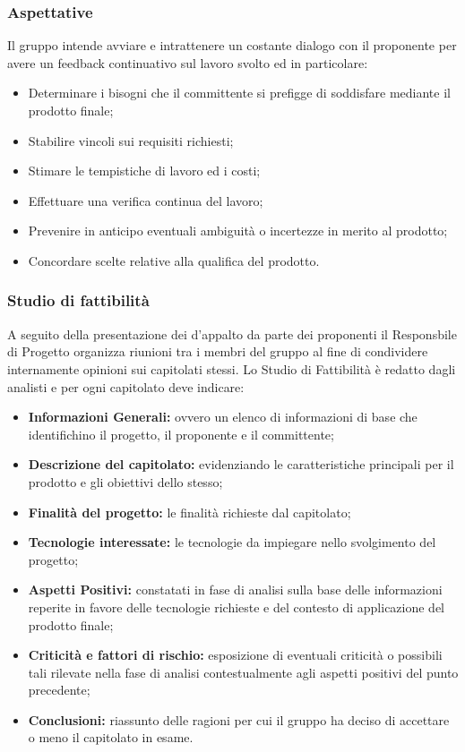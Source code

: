 \subsubsection{Aspettative}
Il gruppo intende avviare e intrattenere un costante dialogo con il proponente per avere un feedback continuativo sul lavoro svolto ed in particolare:
\begin{itemize}
  \item Determinare i bisogni che il committente si prefigge di soddisfare mediante il prodotto finale;
  \item Stabilire vincoli sui requisiti richiesti;
  \item Stimare le tempistiche di lavoro ed i costi;
  \item Effettuare una verifica continua del lavoro;
  \item Prevenire in anticipo eventuali ambiguità o incertezze in merito al prodotto;
  \item Concordare scelte relative alla qualifica del prodotto.
\end{itemize}

\subsubsection{Studio di fattibilità}
\label{_studioDiFattibilita}
A seguito della presentazione dei  d'appalto da parte dei proponenti il Responsbile di Progetto organizza riunioni tra i membri del gruppo al fine di condividere internamente opinioni sui capitolati stessi.
Lo Studio di Fattibilità è redatto dagli analisti e per ogni capitolato deve indicare:
\begin{itemize}
  \item \textbf{Informazioni Generali:} ovvero un elenco di informazioni di base che identifichino il progetto, il proponente e il committente;
  \item \textbf{Descrizione del capitolato:}  evidenziando le caratteristiche principali per il prodotto e gli obiettivi dello stesso;
  \item \textbf {Finalità del progetto:} le finalità richieste dal capitolato;
  \item \textbf {Tecnologie interessate:} le tecnologie da impiegare nello svolgimento del progetto;
  \item \textbf{Aspetti Positivi:} constatati in fase di analisi sulla base delle informazioni reperite in favore delle tecnologie richieste e del contesto di applicazione del prodotto finale;
  \item \textbf{Criticità e fattori di rischio:} esposizione di eventuali criticità o possibili tali rilevate nella fase di analisi contestualmente agli aspetti positivi del punto precedente;
  \item \textbf{Conclusioni:} riassunto delle ragioni per cui il gruppo ha deciso di accettare o meno il capitolato in esame.
\end{itemize}

